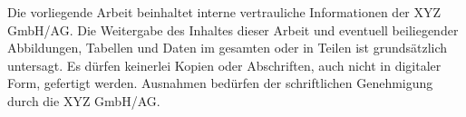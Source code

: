 Die vorliegende Arbeit beinhaltet interne vertrauliche Informationen der XYZ GmbH/AG. Die Weitergabe des Inhaltes dieser Arbeit und eventuell beiliegender Abbildungen, Tabellen und Daten im gesamten oder in Teilen ist grundsätzlich untersagt. Es dürfen keinerlei Kopien oder Abschriften, auch nicht in digitaler Form, gefertigt werden. Ausnahmen bedürfen der schriftlichen Genehmigung durch die XYZ GmbH/AG. 
\newpage